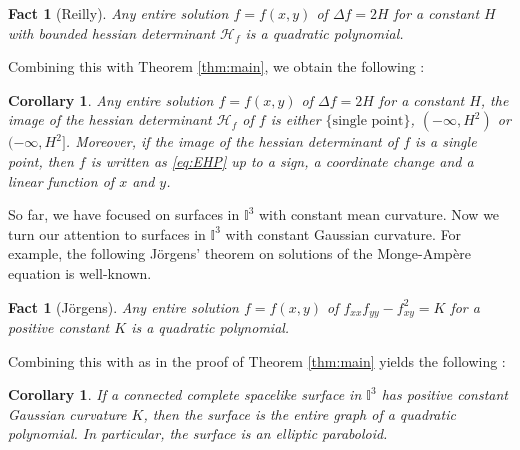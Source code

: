 \documentclass[12pt,a4paper,reqno]{amsart}
\theoremstyle{plain} %
\newtheorem{corollary}[theorem]{Corollary}
\newtheorem{fact}[theorem]{Fact}
\theoremstyle{definition}
\begin{document}
\begin{fact}[Reilly]
Any entire solution $f=f(x,y)$ of $\Delta f =2H$ for a constant $H$ with bounded hessian determinant $\mathcal{H}_f$ is a quadratic polynomial.
\end{fact}

Combining this with Theorem \ref{thm:main}, we obtain the following :

\begin{corollary}
Any entire solution $f=f(x,y)$ of $\Delta f =2H$ for a constant $H$, the image of the hessian determinant $\mathcal{H}_f$ of $f$ is either $\{\text{single point}\}$, $(-\infty, H^2)$ or $(-\infty, H^2]$. Moreover, if the image of the hessian determinant of $f$ is a single point, then $f$ is written as \eqref{eq:EHP} up to a sign, a coordinate change and a linear function of $x$ and $y$.
\end{corollary}

 So far, we have focused on surfaces in $\mathbb{I}^3$ with constant mean curvature. Now we turn our attention to surfaces in $\mathbb{I}^3$ with constant Gaussian curvature. For example, the following J\"orgens' theorem \cite{Jorgens} on solutions of the Monge-Amp\`ere equation is well-known.

\begin{fact}[J\"orgens]
Any entire solution $f=f(x,y)$ of $f_{xx}f_{yy}-f_{xy}^2=K$ for a positive constant $K$  is a quadratic polynomial.
\end{fact}

Combining this with \cite[Theorem 5.1]{S1} as in the proof of Theorem \ref{thm:main} yields the following :

\begin{corollary}
If a connected complete spacelike surface in $\mathbb{I}^3$ has positive constant Gaussian curvature $K$, then the surface is the entire graph of a quadratic polynomial. In particular, the surface is an elliptic paraboloid.
\end{corollary}

\end{document}
